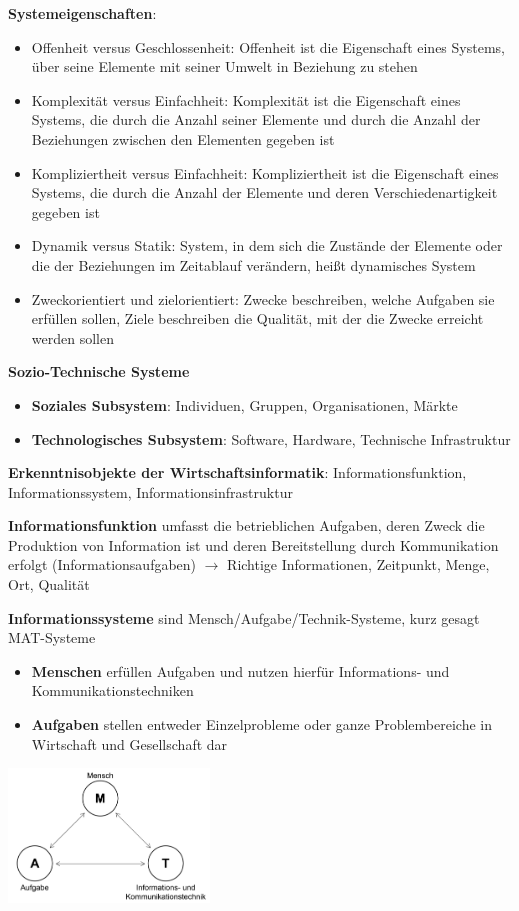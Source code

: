 \pagebreak
\textbf{Systemeigenschaften}:
\begin{itemize}
	\item Offenheit versus Geschlossenheit: Offenheit ist die Eigenschaft eines Systems, über seine Elemente mit seiner Umwelt in Beziehung zu stehen
	\item Komplexität versus Einfachheit: Komplexität ist die Eigenschaft eines Systems, die durch die Anzahl seiner Elemente und durch die Anzahl der Beziehungen zwischen den Elementen gegeben ist
	\item Kompliziertheit versus Einfachheit: Kompliziertheit ist die Eigenschaft eines Systems, die durch die Anzahl der Elemente und deren Verschiedenartigkeit gegeben ist
	\item Dynamik versus Statik: System, in dem sich die Zustände der Elemente oder die der Beziehungen im Zeitablauf verändern, heißt dynamisches System
	\item Zweckorientiert und zielorientiert: Zwecke beschreiben, welche Aufgaben sie erfüllen sollen, Ziele beschreiben die Qualität, mit der die Zwecke erreicht werden sollen
\end{itemize}

\textbf{Sozio-Technische Systeme}
\begin{itemize}
	\item \textbf{Soziales Subsystem}: Individuen, Gruppen, Organisationen, Märkte
	\item \textbf{Technologisches Subsystem}: Software, Hardware,  Technische Infrastruktur
\end{itemize}

\textbf{Erkenntnisobjekte der Wirtschaftsinformatik}: Informationsfunktion, Informationssystem, Informationsinfrastruktur

\textbf{Informationsfunktion} umfasst die betrieblichen Aufgaben, deren Zweck die Produktion von Information ist und deren Bereitstellung durch Kommunikation erfolgt (Informationsaufgaben)
$\rightarrow$ Richtige Informationen, Zeitpunkt, Menge, Ort, Qualität

\textbf{Informationssysteme} sind Mensch/Aufgabe/Technik-Systeme, kurz gesagt MAT-Systeme
\begin{itemize}
	\item \textbf{Menschen} erfüllen Aufgaben und nutzen hierfür Informations- und Kommunikationstechniken
	\item \textbf{Aufgaben} stellen entweder Einzelprobleme oder ganze Problembereiche in Wirtschaft und Gesellschaft dar
\end{itemize}
\begin{center}
	\includegraphics[width=0.4\textwidth]{images/mat.png}
\end{center}

